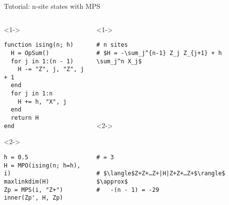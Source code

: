 \begin{frame}[fragile]{Tutorial: n-site states with MPS}


\begin{columns}

\begin{column}{5cm}

\begin{onlyenv}<1->

\begin{lstlisting}[language=JuliaLocal, style=julia, mathescape, basicstyle=\small]
function ising(n; h)
  H = OpSum()
  for j in 1:(n - 1)
    H -= "Z", j, "Z", j + 1
  end
  for j in 1:n
    H += h, "X", j
  end
  return H
end
\end{lstlisting}

\end{onlyenv}

\begin{onlyenv}<2->

\begin{lstlisting}[language=JuliaLocal, style=julia, mathescape, basicstyle=\small]
h = 0.5
H = MPO(ising(n; h=h), i)
maxlinkdim(H)
Zp = MPS(i, "Z+")
inner(Zp', H, Zp)
 \end{lstlisting}

\end{onlyenv}

\end{column}

\begin{column}{5.5cm}

\begin{onlyenv}<1->

\begin{lstlisting}[style=julia, numbers=none, mathescape, basicstyle=\small]
# n sites
# $H = -\sum_j^{n-1} Z_j Z_{j+1} + h \sum_j^n X_j$







 \end{lstlisting}

\end{onlyenv}

\begin{onlyenv}<2->

\begin{lstlisting}[style=julia, numbers=none, mathescape, basicstyle=\small]


# = 3

# $\langle$Z+Z+…Z+|H|Z+Z+…Z+$\rangle$ $\approx$
#   -(n - 1) = -29
\end{lstlisting}

\end{onlyenv}

\end{column}

\end{columns}

\end{frame}
